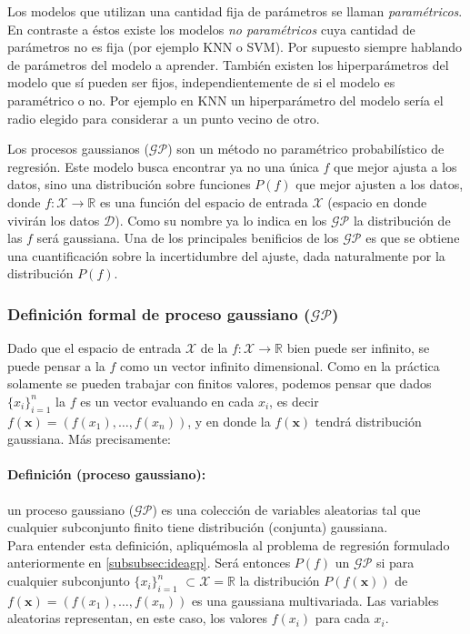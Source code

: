 \documentclass[a4paper]{article}
\newcommand{\gp}{\ensuremath{\mathcal{GP}}}
\begin{document}
Los modelos que utilizan una cantidad fija de parámetros se llaman \emph{paramétricos}. En contraste a éstos existe los modelos \emph{no paramétricos} cuya cantidad de parámetros no es fija (por ejemplo KNN o SVM). Por supuesto siempre hablando de parámetros del modelo a aprender. También existen los hiperparámetros del modelo que sí pueden ser fijos, independientemente de si el modelo es paramétrico o no. Por ejemplo en KNN un hiperparámetro del modelo sería el radio elegido para considerar a un punto vecino de otro.

Los procesos gaussianos ($\gp$) son un método no paramétrico probabilístico de regresión. Este modelo busca encontrar ya no una única $f$ que mejor ajusta a los datos, sino una distribución sobre funciones $P(f)$ que mejor ajusten a los datos, donde $f: \mathcal{X} \to \mathbb{R}$ es una función del espacio de entrada  $\mathcal{X}$ (espacio en donde vivirán los datos $\mathcal{D}$). Como su nombre ya lo indica en los $\gp$ la distribución de las $f$ será gaussiana. Una de los principales benificios de los $\gp$ es que se obtiene una cuantificación sobre la incertidumbre del ajuste, dada naturalmente por la distribución $P(f)$.

\subsubsection{Definición formal de proceso gaussiano ($\gp$)}
\label{subsubsec:defgp}
Dado que el espacio de entrada $\mathcal{X}$ de la $f:\mathcal{X} \to \mathbb{R}$ bien puede ser infinito, se puede pensar a la $f$ como un vector infinito dimensional. Como en la práctica solamente se pueden trabajar con finitos valores, podemos pensar que dados $\{x_i\}_{i=1}^n$ la $f$ es un vector evaluando en cada $x_i$, es decir $f(\mathbf{x}) = \left(f(x_1),\dots,f(x_n)\right)$, y en donde la $f(\mathbf{x})$ tendrá distribución gaussiana. Más precisamente:

\paragraph{Definición (proceso gaussiano):} un proceso gaussiano ($\gp$) es una colección de variables aleatorias tal que cualquier subconjunto finito tiene distribución (conjunta) gaussiana.\\

Para entender esta definición, apliquémosla al problema de regresión formulado anteriormente en \ref{subsubsec:ideagp}. Será entonces $P(f)$ un $\gp$ si para cualquier subconjunto  $\{x_i\}_{i=1}^n$ $\subset \mathcal{X}=\mathbb{R}$ la distribución $P(f(\mathbf{x}))$ de $f(\mathbf{x})= \left(f(x_1),\dots,f(x_n)\right)$ es una gaussiana multivariada. Las variables aleatorias representan, en este caso, los valores $f(x_i)$ para cada $x_i$.
\end{document}
